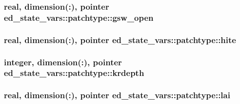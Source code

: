 \subsubsection[{\texorpdfstring{gsw\+\_\+open}{gsw_open}}]{\setlength{\rightskip}{0pt plus 5cm}real, dimension(\+:), pointer ed\+\_\+state\+\_\+vars\+::patchtype\+::gsw\+\_\+open}\hypertarget{structed__state__vars_1_1patchtype_a37e240729c7cccd40baea6614474fec9}{}\label{structed__state__vars_1_1patchtype_a37e240729c7cccd40baea6614474fec9}
\subsubsection[{\texorpdfstring{hite}{hite}}]{\setlength{\rightskip}{0pt plus 5cm}real, dimension(\+:), pointer ed\+\_\+state\+\_\+vars\+::patchtype\+::hite}\hypertarget{structed__state__vars_1_1patchtype_adac59e664c355cc5e6ab5bdff7b1b72f}{}\label{structed__state__vars_1_1patchtype_adac59e664c355cc5e6ab5bdff7b1b72f}
\subsubsection[{\texorpdfstring{krdepth}{krdepth}}]{\setlength{\rightskip}{0pt plus 5cm}integer, dimension(\+:), pointer ed\+\_\+state\+\_\+vars\+::patchtype\+::krdepth}\hypertarget{structed__state__vars_1_1patchtype_af352dbcaf2d6fc32ff8b47119e8510f1}{}\label{structed__state__vars_1_1patchtype_af352dbcaf2d6fc32ff8b47119e8510f1}
\subsubsection[{\texorpdfstring{lai}{lai}}]{\setlength{\rightskip}{0pt plus 5cm}real, dimension(\+:), pointer ed\+\_\+state\+\_\+vars\+::patchtype\+::lai}\hypertarget{structed__state__vars_1_1patchtype_a6da37901c3e47d1ccc478e46dc857a94}{}\label{structed__state__vars_1_1patchtype_a6da37901c3e47d1ccc478e46dc857a94}
